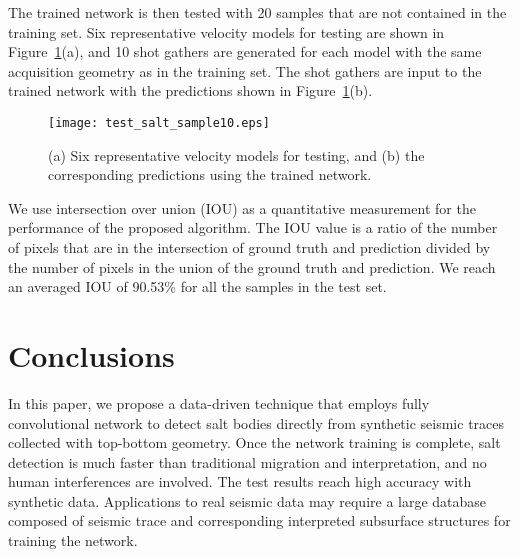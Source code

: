 \documentclass{cph18}
\begin{document}
The trained network is then tested with 20 samples that are not contained in the training set. Six representative velocity models for testing are shown in Figure~\ref{fig:test_salt_sample10}(a), and 10 shot gathers are generated for each model with the same acquisition geometry as in the training set. The shot gathers are input to the trained network with the predictions shown in Figure~\ref{fig:test_salt_sample10}(b).
\begin{figure}[!htb]
  \centering
  \texttt{[image: test\_salt\_sample10.eps]}
  \caption{(a) Six representative velocity models for testing, and (b) the corresponding predictions using the trained network.}
\label{fig:test_salt_sample10}
\end{figure}
We use intersection over union (IOU) as a quantitative measurement for the performance of the proposed algorithm. The IOU value is a ratio of the number of pixels that are in the intersection of ground truth and prediction divided by the number of pixels in the union of the ground truth and prediction.
We reach an averaged IOU of 90.53\% for all the samples in the test set.


\section{Conclusions}

In this paper, we propose a data-driven technique that employs fully convolutional network to detect salt bodies directly from synthetic seismic traces collected with top-bottom geometry. Once the network training is complete, salt detection is much faster than traditional migration and interpretation, and no human interferences are involved. The test results reach high accuracy with synthetic data. Applications to real seismic data may require a large database composed of seismic trace and corresponding interpreted subsurface structures for training the network.


\end{document}
